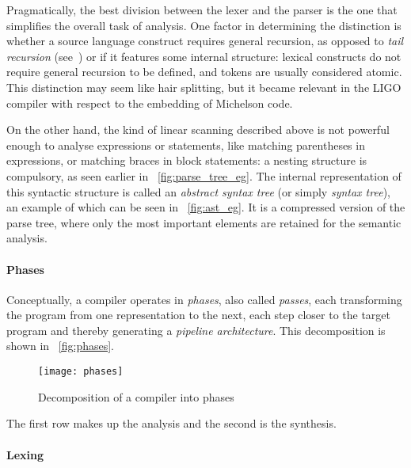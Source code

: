 \documentclass[12pt,a4paper]{article}
\begin{document}
Pragmatically, the best division between the lexer and the parser is
the one that simplifies the overall task of analysis. One factor in
determining the distinction is whether a source language construct
requires general recursion, as opposed to \emph{tail recursion}
(see~\cite{Rinderknecht_2014a}) or if it features some internal
structure: lexical constructs do not require general recursion to be
defined, and tokens are usually considered atomic. This distinction
may seem like hair splitting, but it became relevant in the LIGO
compiler with respect to the embedding of Michelson code.

On the other hand, the kind of linear scanning described above is not
powerful enough to analyse expressions or statements, like matching
parentheses in expressions, or matching braces in block statements: a
nesting structure is compulsory, as seen earlier in
\fig~\vref{fig:parse_tree_eg}. The internal representation of this
syntactic structure is called an \emph{abstract syntax tree} (or
simply \emph{syntax tree}), an example of which can be seen in
\fig~\vref{fig:ast_eg}. It is a compressed version of the parse tree,
where only the most important elements are retained for the semantic
analysis.

\paragraph{Phases}

Conceptually, a compiler operates in \emph{phases}, also called
\emph{passes}, each transforming the program from one representation
to the next, each step closer to the target program and thereby
generating a \emph{pipeline architecture}. This decomposition is shown
in \fig~\vref{fig:phases}.
\begin{figure}
\centering
\texttt{[image: phases]}
\caption{Decomposition of a compiler into phases\label{fig:phases}}
\end{figure}
The first row makes up the analysis and the second is the synthesis.

\paragraph{Lexing}
\end{document}
